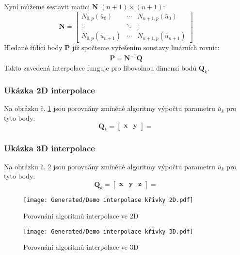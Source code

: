 Nyní můžeme sestavit matici $\bm{N}$ $(n + 1) \times (n + 1)$:
\begin{equation}
    \bm{N} = \begin{bmatrix}
        N_{0,p}(\bar{u}_0)        & \cdots & N_{n+1,p}(\bar{u}_0)       \\
        \vdots                    & \ddots & \vdots                     \\
        N_{0, p}(\bar{u}_{n + 1}) & \cdots & N_{n+1,p}(\bar{u}_{n + 1})
    \end{bmatrix}
\end{equation}
Hledané řídící body $\bm{P}$ již spočteme vyřešením soustavy linárních rovnic:
\begin{align}
    \bm{P} = \bm{N}^{-1}\bm{Q}
\end{align}
Takto zavedená interpolace funguje pro libovolnou dimenzi bodů $\bm{Q}_k$.

\subsubsection{Ukázka 2D interpolace}
Na obrázku č. \ref{fig:Demo interpolace 2D} jsou porovnány zmíněné algoritmy
výpočtu parametru $\bar{u}_k$ pro tyto body:
\begin{equation}
    \bm{Q}_k = \begin{bmatrix}
        \bm{x} & \bm{y}
    \end{bmatrix}
    =
\end{equation}

\subsubsection{Ukázka 3D interpolace}
Na obrázku č. \ref{fig:Demo interpolace 3D} jsou porovnány zmíněné algoritmy
výpočtu parametru $\bar{u}_k$ pro tyto body:
\begin{equation}
    \bm{Q}_k = \begin{bmatrix}
        \bm{x} & \bm{y} & \bm{z}
    \end{bmatrix}
    =
\end{equation}

\begin{imagepage}
    \begin{figure}[H]
        \centering
        \texttt{[image: Generated/Demo interpolace křivky 2D.pdf]}
        \caption{Porovnání algoritmů interpolace ve 2D}
        \label{fig:Demo interpolace 2D}
    \end{figure}
    \begin{figure}[H]
        \centering
        \texttt{[image: Generated/Demo interpolace křivky 3D.pdf]}
        \caption{Porovnání algoritmů interpolace ve 3D}
        \label{fig:Demo interpolace 3D}
    \end{figure}
\end{imagepage}